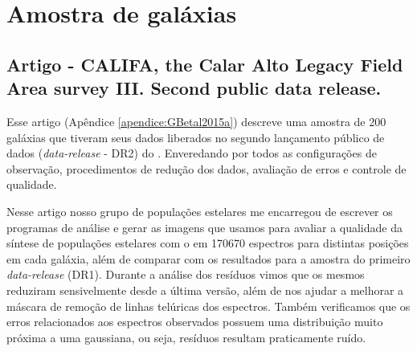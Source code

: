 


\chapter{Amostra de galáxias}
\label{sec:amostra}

\section{Artigo - CALIFA, the Calar Alto Legacy Field Area survey III. Second public data
release.}

Esse artigo (Apêndice \ref{apendice:GBetal2015a}) descreve uma amostra de 200 galáxias que tiveram
seus dados liberados no segundo lançamento público de dados ({\em data-release} - DR2) do \PCAL.
Enveredando por todos as configurações de observação, procedimentos de redução dos dados, avaliação
de erros e controle de qualidade. 

Nesse artigo nosso grupo de populações estelares me encarregou de escrever os programas de análise e
gerar as imagens que usamos para avaliar a qualidade da síntese de populações estelares com o
\starlight em 170670 espectros para distintas posições em cada galáxia, além de comparar com os
resultados para a amostra do primeiro {\em data-release} (DR1). Durante a análise dos resíduos vimos
que os mesmos reduziram sensivelmente desde a última versão, além de nos ajudar a melhorar a máscara
de remoção de linhas telúricas dos espectros. Também verificamos que os erros relacionados aos
espectros observados possuem uma distribuição muito próxima a uma gaussiana, ou seja, resíduos
resultam praticamente ruído.

